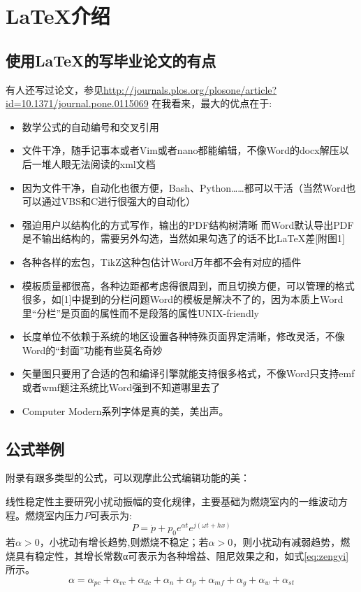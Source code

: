 \chapter{\LaTeX{}介绍}
\section{使用\LaTeX{}的写毕业论文的有点}
有人还写过论文，参见\url{http://journals.plos.org/plosone/article?id=10.1371/journal.pone.0115069}
在我看来，最大的优点在于:
\begin{itemize}
	\item 数学公式的自动编号和交叉引用\cite{merry_1975_PenetrationVerticalJets}
	\item 文件干净，随手记事本或者Vim或者nano都能编辑，不像Word的docx解压以后一堆人眼无法阅读的xml文档\cite{mendez_1998_StudyGasVelocity}
	\item 因为文件干净，自动化也很方便，Bash、Python……都可以干活（当然Word也可以通过VBS和C进行很强大的自动化）
	\item 强迫用户以结构化的方式写作，输出的PDF结构树清晰\cite{crawford_1995_FutureLibrariesDreams}
	而Word默认导出PDF是不输出结构的，需要另外勾选，当然如果勾选了的话不比LaTeX差[附图1]
	\item 各种各样的宏包，TikZ这种包估计Word万年都不会有对应的插件\cite{allen_1996_ReviewPerformanceEngineering,bilitza_2014_InternationalReferenceIonosphere,bilitza_2012_MeasurementsIRIModel,bilitza_2008_InternationalReferenceIonosphere,zhanghui_2012_WoGuoCuiHuaLieHuaGongYiJiZhuFaZhanYuQuShi}
	\item 模板质量都很高，各种边距都考虑得很周到，而且切换方便，可以管理的格式很多，如[1]中提到的分栏问题Word的模板是解决不了的，因为本质上Word里“分栏”是页面的属性而不是段落的属性UNIX-friendly
	\item 长度单位不依赖于系统的地区设置各种特殊页面界定清晰，修改灵活，不像Word的“封面”功能有些莫名奇妙~
	\item 矢量图只要用了合适的包和编译引擎就能支持很多格式，不像Word只支持emf或者wmf题注系统比Word强到不知道哪里去了
    \item Computer Modern系列字体是真的美，美出声。
\end{itemize}


\section{公式举例}
附录有跟多类型的公式，可以观摩此公式编辑功能的美：

线性稳定性主要研究小扰动振幅的变化规律，主要基础为燃烧室内的一维波动方程。燃烧室内压力$P$可表示为:
\begin{equation}
P=\dot{p}+p_0 e^{\alpha t} e^{j(\omega t+hx)}\label{eq:pressue p}
\end{equation}
若$\alpha>0$，小扰动有增长趋势,则燃烧不稳定；若$\alpha>0$，则小扰动有减弱趋势，燃烧具有稳定性，其增长常数α可表示为各种增益、阻尼效果之和，如式\ref{eq:zengyi}所示。
\begin{equation}
\alpha=\alpha_{pc}+\alpha_{vc}+\alpha_{dc}+\alpha_n+\alpha_p+\alpha_{mf}+\alpha_{g}+\alpha_{w}+\alpha_{st}\label{eq:zengyi}
\end{equation}


